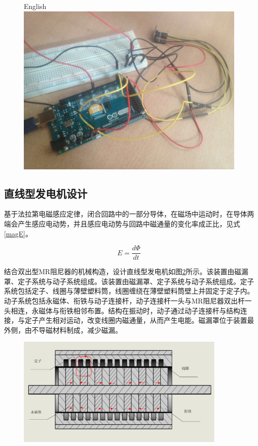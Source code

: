 \begin{figure}[H]
	\centering
		{English}
	\label{arduino}
	\includegraphics[width=.5\linewidth]{figure/arduino}
\end{figure}




\subsection{直线型发电机设计}
基于法拉第电磁感应定律，闭合回路中的一部分导体，在磁场中运动时，在导体两端会产生感应电动势，并且感应电动势与回路中磁通量的变化率成正比\cite{elliott1993}，见式\eqref{magE}。

\begin{equation}
\label{magE}
E=\frac{d\Phi}{dt}
\end{equation}

结合双出型MR阻尼器的机械构造，设计直线型发电机如图\ref{powerstation}所示。该装置由磁漏罩、定子系统与动子系统组成。该装置由磁漏罩、定子系统与动子系统组成。定子系统包括定子、线圈与薄壁塑料筒，线圈缠绕在薄壁塑料筒壁上并固定于定子内。动子系统包括永磁体、衔铁与动子连接杆，动子连接杆一头与MR阻尼器双出杆一头相连，永磁体与衔铁相邻布置。结构在振动时，动子通过动子连接杆与结构连接，与定子产生相对运动，改变线圈内磁通量，从而产生电能。磁漏罩位于装置最外侧，由不导磁材料制成，减少磁漏。

\begin{figure}[H]
\centering
{}
\label{powerstation}
\includegraphics[width=4in]{figure/straight}
\end{figure}


